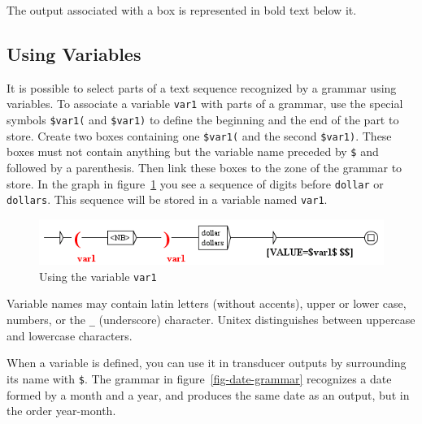 \noindent The output associated with a box is represented in bold text below it.

\subsection{Using Variables}
\label{section-using-variables}
\index{\verb+$+}

It is possible to select parts of a text sequence recognized by a grammar using
variables. To associate a variable \verb+var1+ with parts of a grammar, use the special
symbols \verb+$var1(+ and \verb+$var1)+ to define the beginning and the end of
the part to store. Create two boxes containing one \verb+$var1(+ and the second
\verb+$var1)+. These boxes must not contain anything but the variable name
preceded by \verb+$+ and followed by a parenthesis. Then link these boxes to the
zone of the grammar to store. In the graph in
figure~\ref{fig-using-variable} you see a sequence of digits before
\verb+dollar+ or \verb+dollars+. This sequence will be stored in a variable named
\verb+var1+.

\bigskip
\begin{figure}[h]
\begin{center}
\includegraphics[width=13.5cm]{resources/img/fig5-16.png}
\caption{Using the variable
\texttt{var1}\label{fig-using-variable}}
\end{center}
\end{figure}

\noindent Variable names may contain latin letters (without accents), upper or
lower case, numbers, or the \verb+_+ (underscore) character.\index{\verb+_+} Unitex distinguishes between uppercase and lowercase characters.

\bigskip
\noindent When a variable is defined, you can use it in transducer outputs by
surrounding its name with \verb+$+.\index{\verb+$+} The grammar in
figure~\ref{fig-date-grammar} recognizes a date formed by a month and a
year, and produces the same date as an output, but in the order year-month.

